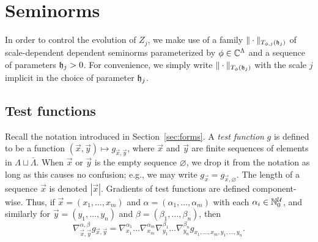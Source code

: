 
\section{Seminorms}

In order to control the evolution of $Z_j$, we make use of a family
$\|\cdot\|_{T_{\phi,j}(\mathfrak{h}_j)}$ of scale-dependent dependent seminorms parameterized
by $\phi\in\mathbb{C}^\Lambda$ and a sequence of parameters $\mathfrak{h}_j > 0$. For convenience,
we simply write $\|\cdot\|_{T_\phi(\mathfrak{h}_j)}$ with the scale $j$ implicit in the
choice of parameter $\mathfrak{h}_j$.

\subsection{Test functions}

Recall the notation introduced in Section~\ref{sec:forms}.
A \emph{test function} $g$ is defined to be a function $(\vec x, \vec y) \mapsto g_{\vec x,\vec y}$,
where $\vec x$ and $\vec y$ are finite sequences of elements in $\Lambda \sqcup \bar\Lambda$.
When $\vec x$ or $\vec y$ is the empty sequence $\varnothing$,
we drop it from the notation as long as this causes no confusion;
e.g., we may write $g_{\vec x} = g_{\vec x,\varnothing}$.
The length of a sequence $\vec x$ is denoted $|\vec x|$.
Gradients of test functions are defined component-wise.
Thus, if $\vec x = (x_1, \ldots, x_m)$
and $\alpha = (\alpha_1, \ldots, \alpha_m)$
with each $\alpha_i \in {\mathbb N}_0^{\mathcal{U}}$, and similarly for $\vec y=(y_1,\ldots,y_n)$ and
$\beta=(\beta_1,\ldots,\beta_n)$,
then
\begin{equation}
\nabla^{\alpha,\beta}_{\vec x,\vec y} g_{\vec x,\vec y}
  =
\nabla^{\alpha_1}_{x_1} \ldots \nabla^{\alpha_m}_{x_m}
\nabla^{\beta_1}_{y_1} \ldots \nabla^{\beta_n}_{y_n}  g_{x_1,\ldots,x_m,y_1,\ldots,y_n}.
\end{equation}

